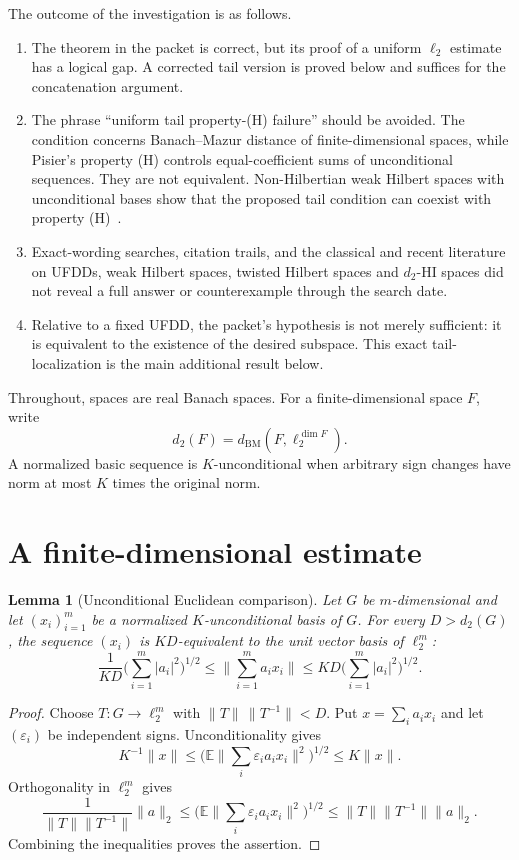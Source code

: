\documentclass[11pt]{article}
\newtheorem{lemma}[theorem]{Lemma}
\theoremstyle{definition}
\newcommand{\dd}{d_2}
\newcommand{\BM}{d_{\mathrm{BM}}}
\begin{document}
The outcome of the investigation is as follows.
\begin{enumerate}
\item The theorem in the packet is correct, but its proof of a uniform
      $\ell_2$ estimate has a logical gap.  A corrected tail version is proved
      below and suffices for the concatenation argument.
\item The phrase ``uniform tail property-(H) failure'' should be avoided.  The
      condition concerns Banach--Mazur distance of finite-dimensional spaces,
      while Pisier's property (H) controls equal-coefficient sums of
      unconditional sequences.  They are not equivalent.  Non-Hilbertian weak
      Hilbert spaces with unconditional bases show that the proposed tail
      condition can coexist with property (H)~\cite{Pisier,NTJ,ABR}.
\item Exact-wording searches, citation trails, and the classical and recent
      literature on UFDDs, weak Hilbert spaces, twisted Hilbert spaces and
      $d_2$-HI spaces did not reveal a full answer or counterexample through
      the search date.
\item Relative to a fixed UFDD, the packet's hypothesis is not merely
      sufficient: it is equivalent to the existence of the desired subspace.
      This exact tail-localization is the main additional result below.
\end{enumerate}

Throughout, spaces are real Banach spaces.  For a finite-dimensional space
$F$, write
\[
  \dd(F)=\BM(F,\ell_2^{\dim F}).
\]
A normalized basic sequence is $K$-unconditional when arbitrary sign changes
have norm at most $K$ times the original norm.

\section{A finite-dimensional estimate}

\begin{lemma}[Unconditional Euclidean comparison]\label{lem:finite-euclidean}
Let $G$ be $m$-dimensional and let $(x_i)_{i=1}^m$ be a normalized
$K$-unconditional basis of $G$.  For every $D>\dd(G)$, the sequence $(x_i)$ is
$KD$-equivalent to the unit vector basis of $\ell_2^m$:
\[
  \frac{1}{KD}\Big(\sum_{i=1}^m |a_i|^2\Big)^{1/2}
  \leq \Big\|\sum_{i=1}^m a_i x_i\Big\|
  \leq KD\Big(\sum_{i=1}^m |a_i|^2\Big)^{1/2}.
\]
\end{lemma}

\begin{proof}
Choose $T:G\to\ell_2^m$ with $\|T\|\,\|T^{-1}\|<D$.  Put
$x=\sum_i a_i x_i$ and let $(\varepsilon_i)$ be independent signs.
Unconditionality gives
\[
 K^{-1}\|x\|\leq
 \Big(\mathbb E\big\|\sum_i\varepsilon_i a_i x_i\big\|^2\Big)^{1/2}
 \leq K\|x\|.
\]
Orthogonality in $\ell_2^m$ gives
\[
 \frac{1}{\|T\|\|T^{-1}\|}\|a\|_2
 \leq
 \Big(\mathbb E\big\|\sum_i\varepsilon_i a_i x_i\big\|^2\Big)^{1/2}
 \leq \|T\|\|T^{-1}\|\|a\|_2.
\]
Combining the inequalities proves the assertion.
\end{proof}
\end{document}
